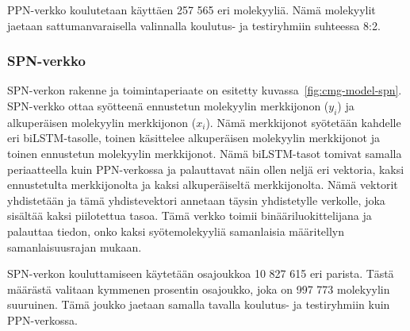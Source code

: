 \documentclass[finnish,twoside,censored,tkt,sw-line]{HYthesisML}
\begin{document}
PPN-verkko koulutetaan käyttäen 257 565 eri molekyyliä.
Nämä molekyylit jaetaan sattumanvaraisella valinnalla koulutus- ja testiryhmiin suhteessa 8:2.

\subsubsection{SPN-verkko}

SPN-verkon rakenne ja toimintaperiaate on esitetty kuvassa~\ref{fig:cmg-model-spn}.
SPN-verkko ottaa syötteenä ennustetun molekyylin merkkijonon (\(y_i\)) ja alkuperäisen molekyylin merkkijonon (\(x_i\)).
Nämä merkkijonot syötetään kahdelle eri biLSTM-tasolle, toinen käsittelee alkuperäisen molekyylin merkkijonot ja toinen ennustetun molekyylin merkkijonot.
Nämä biLSTM-tasot tomivat samalla periaatteella kuin PPN-verkossa ja palauttavat näin ollen neljä eri vektoria, kaksi ennustetulta merkkijonolta ja kaksi alkuperäiseltä merkkijonolta.
Nämä vektorit yhdistetään ja tämä yhdistevektori annetaan täysin yhdistetylle verkolle, joka sisältää kaksi piilotettua tasoa.
Tämä verkko toimii binääriluokittelijana ja palauttaa tiedon, onko kaksi syötemolekyyliä samanlaisia määritellyn samanlaisuusrajan mukaan.

SPN-verkon kouluttamiseen käytetään osajoukkoa 10 827 615 eri parista.
Tästä määrästä valitaan kymmenen prosentin osajoukko, joka on 997 773 molekyylin suuruinen.
Tämä joukko jaetaan samalla tavalla koulutus- ja testiryhmiin kuin PPN-verkossa.
\end{document}
